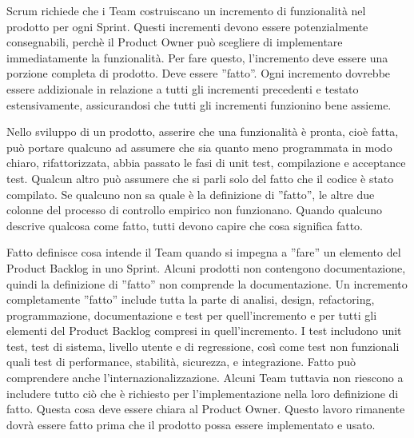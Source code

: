 
Scrum richiede che i Team costruiscano un incremento di funzionalit\`a nel prodotto per ogni Sprint. Questi incrementi devono essere potenzialmente consegnabili, perch\`e  il Product Owner pu\`o scegliere di implementare immediatamente la funzionalit\`a. Per fare questo, l'incremento deve essere una porzione completa di prodotto. Deve essere  ''fatto''. Ogni incremento dovrebbe essere addizionale in relazione a tutti gli incrementi precedenti e testato estensivamente, assicurandosi che tutti gli incrementi funzionino bene assieme.

Nello sviluppo di un prodotto, asserire che una funzionalit\`a è pronta, cio\`e fatta, pu\`o portare qualcuno ad assumere che sia quanto meno programmata in modo chiaro, rifattorizzata, abbia passato le fasi di unit test, compilazione e acceptance test. Qualcun altro pu\`o assumere che si parli solo del fatto che il codice \`e stato compilato. Se qualcuno non sa quale \`e la definizione di ''fatto'', le altre due colonne del processo di controllo empirico non funzionano. Quando qualcuno descrive qualcosa come fatto, tutti devono capire che cosa significa fatto.

Fatto definisce cosa intende il Team quando si impegna a ''fare'' un elemento del Product Backlog in uno Sprint. Alcuni prodotti non contengono documentazione, quindi la definizione di ''fatto'' non comprende la documentazione. Un incremento completamente ''fatto'' include tutta la parte di analisi, design, refactoring, programmazione, documentazione e test per quell'incremento e per tutti gli elementi del Product Backlog compresi in quell'incremento. I test includono unit test, test di sistema, livello utente e di regressione, cos\`i come test non funzionali quali test di performance, stabilit\`a, sicurezza, e integrazione. Fatto pu\`o comprendere anche l'internazionalizzazione. Alcuni Team tuttavia non riescono a includere tutto ci\`o che \`e richiesto per l'implementazione nella loro definizione di fatto. Questa cosa deve essere chiara al Product Owner. Questo lavoro rimanente dovr\`a essere fatto prima che il prodotto possa essere implementato e usato.
